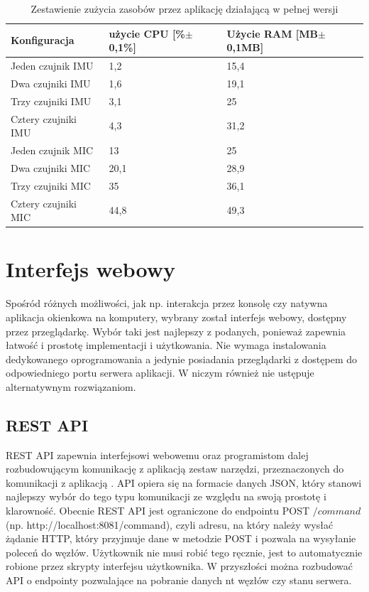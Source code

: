 \documentclass[12pt,oneside,a4paper]{book}
\theoremstyle{break}
\begin{document}
\begin{table}[H]
    \centering
    \begin{tabularx}{\textwidth}{|X | X | X|}
        \hline
        Konfiguracja & użycie CPU [\%$\pm$0,1\%] & Użycie RAM [MB$\pm$0,1MB]\\
        \hline
        Jeden czujnik IMU & 1,2 & 15,4 \\
        \hline
        Dwa czujniki IMU & 1,6 & 19,1 \\ 
        \hline
        Trzy czujniki IMU & 3,1 & 25 \\ 
        \hline
        Cztery czujniki IMU & 4,3 & 31,2 \\ 
        \hline
        Jeden czujnik MIC & 13 & 25 \\ 
        \hline
        Dwa czujniki MIC & 20,1 & 28,9 \\ 
        \hline
        Trzy czujniki MIC & 35 & 36,1 \\ 
        \hline
        Cztery czujniki MIC & 44,8 & 49,3 \\ 
        \hline
        \end{tabularx}
        \caption{Zestawienie zużycia zasobów przez aplikację działającą w pełnej wersji}
        \label{tab:zestawienie-wydajnosci}
\end{table}

\section{Interfejs webowy}
Spośród różnych możliwości, jak np. interakcja przez konsolę czy
natywna aplikacja okienkowa na komputery, wybrany został interfejs
webowy, dostępny przez przeglądarkę. Wybór taki jest najlepszy z
podanych, ponieważ zapewnia łatwość i prostotę implementacji i 
użytkowania. Nie wymaga instalowania dedykowanego oprogramowania 
a jedynie posiadania przeglądarki z dostępem do odpowiedniego
portu serwera aplikacji. W niczym również nie ustępuje alternatywnym
rozwiązaniom.

\subsection{REST API}
REST API zapewnia interfejsowi webowemu oraz programistom dalej
rozbudowującym komunikację z aplikacją zestaw narzędzi, przeznaczonych
do komunikacji z  aplikacją \cite{rest-api}. API opiera się na formacie danych JSON, 
który stanowi najlepszy wybór do tego typu komunikacji ze względu
na swoją prostotę i klarowność. Obecnie REST API jest ograniczone
do endpointu POST $/command$ (np. http://localhost:8081/command),
 czyli adresu, na który należy wysłać 
żądanie HTTP, który przyjmuje dane w metodzie POST i 
pozwala na wysyłanie poleceń do węzłów. Użytkownik nie musi robić tego ręcznie, 
jest to automatycznie robione przez skrypty interfejsu użytkownika. 
W przyszłości można 
rozbudować API o endpointy pozwalające na pobranie danych nt węzłów
czy stanu serwera.
\end{document}
